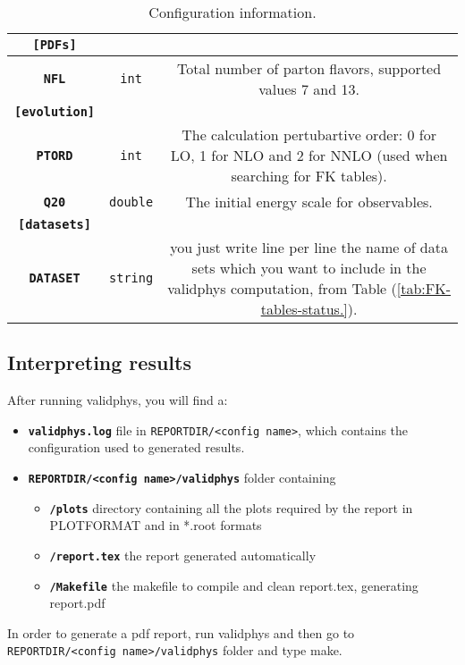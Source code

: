 \begin{table}[H]
\begin{centering}
\begin{tabular}{|c|c|c|}
\hline 
\hline 
\texttt{\textbf{{[}PDFs{]}}} &  & \tabularnewline
\hline 
\hline 
\texttt{\textbf{NFL}} & \texttt{int} & %
\begin{minipage}[t]{0.5\columnwidth}%
Total number of parton flavors, supported values 7 and 13.%
\end{minipage}\tabularnewline
\hline 
\hline 
\texttt{\textbf{{[}evolution{]}}} &  & \tabularnewline
\hline 
\hline 
\texttt{\textbf{PTORD}} & \texttt{int} & %
\begin{minipage}[t]{0.5\columnwidth}%
The calculation pertubartive order: 0 for LO, 1 for NLO and 2 for
NNLO (used when searching for FK tables).%
\end{minipage}\tabularnewline
\hline 
\texttt{\textbf{Q20}} & \texttt{double} & %
\begin{minipage}[t]{0.5\columnwidth}%
The initial energy scale for observables.%
\end{minipage}\tabularnewline
\hline 
\hline 
\texttt{\textbf{{[}datasets{]}}} &  & \tabularnewline
\hline 
\hline 
\texttt{\textbf{DATASET}} & \texttt{string} & %
\begin{minipage}[t]{0.5\columnwidth}%
you just write line per line the name of data sets which you want
to include in the validphys computation, from Table (\ref{tab:FK-tables-status.}).%
\end{minipage}\tabularnewline
\hline 
\end{tabular}
\par\end{centering}

\caption{\label{tab:Configuration-information.}Configuration information.}
\end{table}



\subsection{Interpreting results}

After running validphys, you will find a: 
\begin{itemize}
\item \texttt{\textbf{validphys.log}} file in \texttt{REPORTDIR/<config name>}, which
contains the configuration used to generated results. 
\item \texttt{\textbf{REPORTDIR/<config name>/validphys}} folder containing

\begin{itemize}
\item \texttt{\textbf{/plots}} directory containing all the plots required
by the report in PLOTFORMAT and in {*}.root formats
\item \texttt{\textbf{/report.tex}}\textbf{ }the report generated automatically 
\item \texttt{\textbf{/Makefile}}\textbf{ }the makefile to compile and clean
report.tex, generating report.pdf 
\end{itemize}
\end{itemize}
In order to generate a pdf report, run validphys and then go to \texttt{REPORTDIR/<config name>/validphys}
folder and type make.

